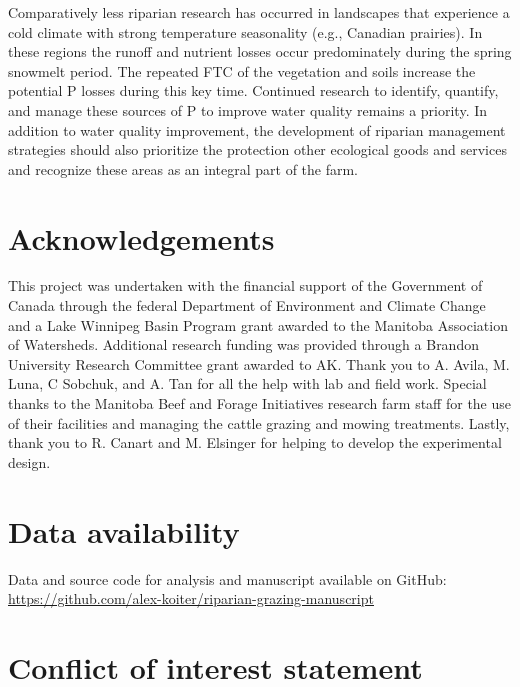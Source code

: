 \documentclass[
]{agujournal2019}
\begin{document}
Comparatively less riparian research has occurred in landscapes that
experience a cold climate with strong temperature seasonality (e.g.,
Canadian prairies). In these regions the runoff and nutrient losses
occur predominately during the spring snowmelt period. The repeated FTC
of the vegetation and soils increase the potential P losses during this
key time. Continued research to identify, quantify, and manage these
sources of P to improve water quality remains a priority. In addition to
water quality improvement, the development of riparian management
strategies should also prioritize the protection other ecological goods
and services and recognize these areas as an integral part of the farm.

\section*{Acknowledgements}\label{acknowledgements}

This project was undertaken with the financial support of the Government
of Canada through the federal Department of Environment and Climate
Change and a Lake Winnipeg Basin Program grant awarded to the Manitoba
Association of Watersheds. Additional research funding was provided
through a Brandon University Research Committee grant awarded to AK.
Thank you to A. Avila, M. Luna, C Sobchuk, and A. Tan for all the help
with lab and field work. Special thanks to the Manitoba Beef and Forage
Initiatives research farm staff for the use of their facilities and
managing the cattle grazing and mowing treatments. Lastly, thank you to
R. Canart and M. Elsinger for helping to develop the experimental
design.

\section*{Data availability}\label{data-availability}

Data and source code for analysis and manuscript available on GitHub:
\url{https://github.com/alex-koiter/riparian-grazing-manuscript}

\section*{Conflict of interest
statement}\label{conflict-of-interest-statement}
\end{document}

